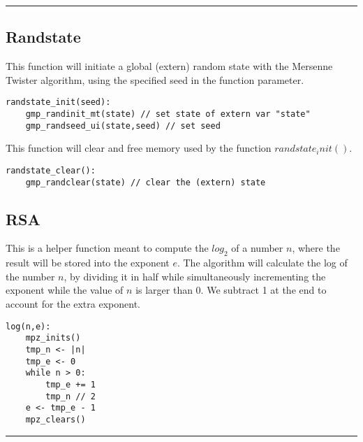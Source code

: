 \documentclass[
	12pt, %
]{fphw}
\begin{document}
\noindent\rule{6.3in}{0.4pt}


\subsection{Randstate}

This function will initiate a global (extern) random state with the Mersenne Twister algorithm, using the specified seed in the function parameter.
\begin{lstlisting}[mathescape=true]
randstate_init(seed):
	gmp_randinit_mt(state) // set state of extern var "state"
	gmp_randseed_ui(state,seed) // set seed
\end{lstlisting}

This function will clear and free memory used by the function $randstate_init()$.
\begin{lstlisting}[mathescape=true]
randstate_clear():
	gmp_randclear(state) // clear the (extern) state
\end{lstlisting}


\subsection{RSA}

This is a helper function meant to compute the $log_2$ of a number $n$, where the result will be stored into the exponent $e$. The algorithm will calculate the log of the number $n$, by dividing it in half while simultaneously incrementing the exponent while the value of $n$ is larger than 0. We subtract 1 at the end to account for the extra exponent.
\begin{lstlisting}[mathescape=true]
log(n,e):
	mpz_inits()
	tmp_n <- |n|
	tmp_e <- 0
	while n > 0:
		tmp_e += 1
		tmp_n // 2
	e <- tmp_e - 1
	mpz_clears()
\end{lstlisting}

\noindent\rule{6.3in}{0.4pt}
\end{document}
